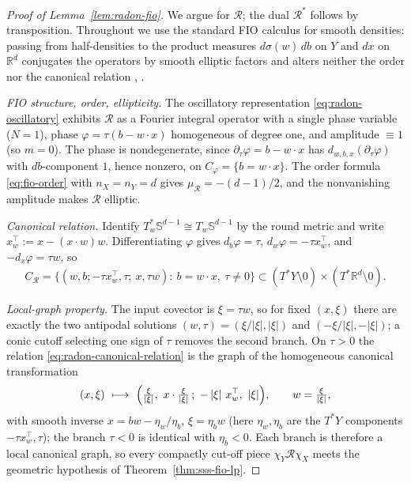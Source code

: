\documentclass[12pt]{article}
\numberwithin{equation}{section}
\numberwithin{figure}{section}
\numberwithin{equation}{section}
\newcommand{\R}{\mathbb{R}}
\newcommand{\Sph}{\mathbb S}
\newcommand{\abs}[1]{\left|#1\right|}
\begin{document}
\begin{proof}[Proof of Lemma~\ref{lem:radon-fio}]
We argue for $\mathcal R$; the dual $\mathcal R^*$ follows by transposition.
Throughout we use the standard FIO calculus for smooth densities: passing from
half-densities to the product measures $d\sigma(w)\,db$ on $Y$ and $dx$ on $\R^d$
conjugates the operators by smooth elliptic factors and alters neither the order
nor the canonical relation
\cite[\S6]{guillemin_GeometricAsymptotics_1977},
\cite[App.~A]{quinto_IntroductionXrayTomography_2006}.

\emph{FIO structure, order, ellipticity.}  The oscillatory representation
\eqref{eq:radon-oscillatory} exhibits $\mathcal R$ as a Fourier integral operator
with a single phase variable ($N=1$), phase $\varphi=\tau(b-w\cdot x)$ homogeneous
of degree one, and amplitude $\equiv1$ (so $m=0$).  The phase is nondegenerate,
since $\partial_\tau\varphi=b-w\cdot x$ has $d_{w,b,x}(\partial_\tau\varphi)$ with
$db$-component $1$, hence nonzero, on $C_\varphi=\{b=w\cdot x\}$.  The order formula
\eqref{eq:fio-order} with $n_X=n_Y=d$ gives $\mu_{\mathcal R}=-(d-1)/2$, and the
nonvanishing amplitude makes $\mathcal R$ elliptic.

\emph{Canonical relation.}  Identify $T_w^*\Sph^{d-1}\cong T_w\Sph^{d-1}$ by the
round metric and write $x_w^\top:=x-(x\cdot w)w$.  Differentiating $\varphi$ gives
$d_b\varphi=\tau$, $d_w\varphi=-\tau x_w^\top$, and $-d_x\varphi=\tau w$, so
\begin{align}
    C_{\mathcal R}
    =\bigl\{(w,b;-\tau x_w^\top,\tau;\ x,\tau w):\ b=w\cdot x,\ \tau\neq0\bigr\}
    \subset(T^*Y\setminus0)\times(T^*\R^d\setminus0).
    \label{eq:radon-canonical-relation}
\end{align}

\emph{Local-graph property.}  The input covector is $\xi=\tau w$, so for fixed
$(x,\xi)$ there are exactly the two antipodal solutions
$(w,\tau)=(\xi/\abs\xi,\abs\xi)$ and $(-\xi/\abs\xi,-\abs\xi)$; a conic cutoff
selecting one sign of $\tau$ removes the second branch.  On $\tau>0$ the relation
\eqref{eq:radon-canonical-relation} is the graph of the homogeneous canonical
transformation
\begin{align*}
    (x,\xi)\ \longmapsto\
    \Bigl(\tfrac{\xi}{\abs\xi},\ x\cdot\tfrac{\xi}{\abs\xi}\,;\
    -\abs\xi\,x_w^\top,\ \abs\xi\Bigr),
    \qquad w=\tfrac{\xi}{\abs\xi},
\end{align*}
with smooth inverse $x=bw-\eta_w/\eta_b$, $\xi=\eta_b w$ (here $\eta_w,\eta_b$ are
the $T^*Y$ components $-\tau x_w^\top,\tau$); the branch $\tau<0$ is identical with
$\eta_b<0$.  Each branch is therefore a local canonical graph, so every compactly
cut-off piece $\chi_Y\mathcal R\chi_X$ meets the geometric hypothesis of
Theorem~\ref{thm:sss-fio-lp}.


\end{proof}
\end{document}

